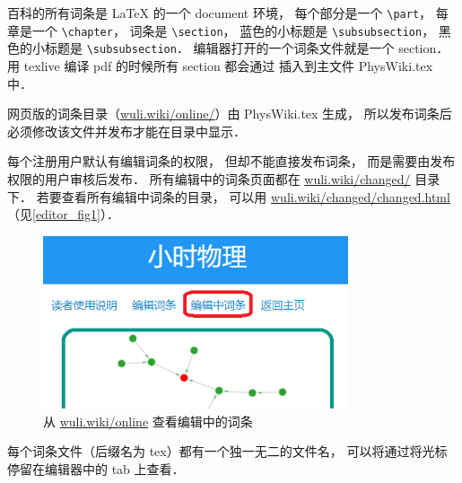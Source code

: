 百科的所有词条是 LaTeX 的一个 document 环境， 每个部分是一个 \lstinline|\part|， 每章是一个 \lstinline|\chapter|， 词条是 \lstinline|\section|， 蓝色的小标题是 \lstinline|\subsubsection|， 黑色的小标题是 \lstinline|\subsubsection|． 编辑器打开的一个词条文件就是一个 section． 用 texlive 编译 pdf 的时候所有 section 都会通过 \lstinline|| 插入到主文件 PhysWiki.tex 中．

网页版的词条目录（\href{http://wuli.wiki/online/}{wuli.wiki/online/}）由 PhysWiki.tex 生成， 所以发布词条后必须修改该文件并发布才能在目录中显示．

每个注册用户默认有编辑词条的权限， 但却不能直接发布词条， 而是需要由发布权限的用户审核后发布． 所有编辑中的词条页面都在 \href{http://wuli.wiki/changed/}{wuli.wiki/changed/} 目录下． 若要查看所有编辑中词条的目录， 可以用 \href{http://wuli.wiki/changed/changed.html}{wuli.wiki/changed/changed.html}（见\autoref{editor_fig1}）．

\begin{figure}[ht]
\centering
\includegraphics[width=9cm]{./figures/editor1.png}
\caption{从 \href{http://wuli.wiki/online}{wuli.wiki/online} 查看编辑中的词条} \label{editor_fig1}
\end{figure}

每个词条文件（后缀名为 tex）都有一个独一无二的文件名， 可以将通过将光标停留在编辑器中的 tab 上查看．

